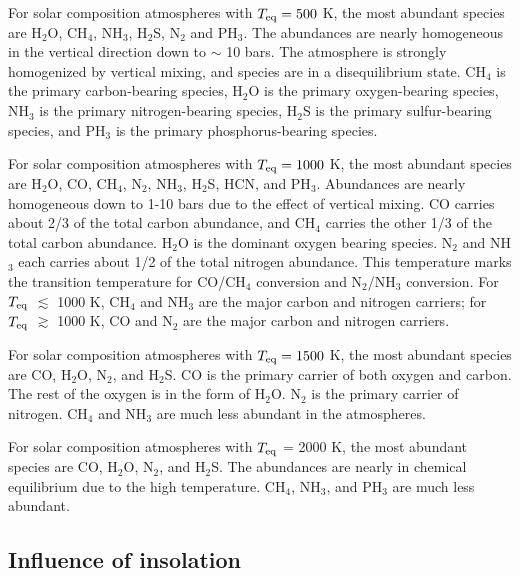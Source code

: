 \documentclass[twocolumn]{aastex61}
\begin{document}
For solar composition atmospheres with $T_{\rm eq} = 500$ K, the most abundant species are H$_2$O, CH$_4$, NH$_3$, H$_2$S, N$_2$ and PH$_3$. The abundances are nearly homogeneous in the vertical direction down to $\sim$ 10 bars. The atmosphere is strongly homogenized by vertical mixing, and species are in a disequilibrium state. CH$_4$ is the primary carbon-bearing species, H$_2$O is the primary oxygen-bearing species, NH$_3$ is the primary nitrogen-bearing species, H$_2$S is the primary sulfur-bearing species, and PH$_3$ is the primary phosphorus-bearing species. 

For solar composition atmospheres with $T_{\rm eq} = 1000$ K, the most abundant species are H$_2$O, CO, CH$_4$, N$_2$, NH$_3$, H$_2$S, HCN, and PH$_3$. Abundances are nearly homogeneous down to 1-10 bars due to the effect of vertical mixing. CO carries about 2/3 of the total carbon abundance, and CH$_4$ carries the other 1/3 of the total carbon abundance. H$_2$O is the dominant oxygen bearing species. N$_2$ and NH$_3$ each carries about 1/2 of the total nitrogen abundance. This temperature marks the transition temperature for CO/CH$_4$ conversion and N$_2$/NH$_3$ conversion. For $T_{\rm eq}$ $\lesssim$ 1000 K, CH$_4$ and NH$_3$ are the major carbon and nitrogen carriers; for $T_{\rm eq}$ $\gtrsim$ 1000 K, CO and N$_2$ are the major carbon and nitrogen carriers.   

For solar composition atmospheres with $T_{\rm eq} = 1500$ K, the most abundant species are CO, H$_2$O, N$_2$, and H$_2$S. CO is the primary carrier of both oxygen and carbon. The rest of the oxygen is in the form of H$_2$O. N$_2$ is the primary carrier of nitrogen. CH$_4$ and NH$_3$ are much less abundant in the atmospheres. 

For solar composition atmospheres with $T_{\rm eq}$ = 2000 K, the most abundant species are CO, H$_2$O, N$_2$, and H$_2$S. The abundances are nearly in chemical equilibrium due to the high temperature. CH$_4$, NH$_3$, and PH$_3$ are much less abundant. 

\subsection{Influence of insolation}\label{subsec:insolation}
\end{document}
